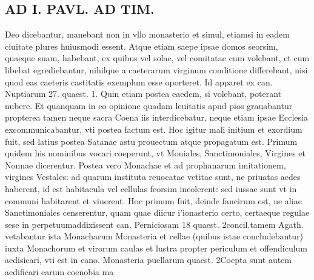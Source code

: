 \documentclass{article}
\begin{document}
\begin{pages}
\section*{AD I. PAVL. AD TIM. }
\marginpar{[ p.292 ]}\pstart Deo dicebantur, manebant non in vllo monasterio et simul, etiamsi in eadem ciuitate plures huiusmodi essent. Atque etiam saepe ipsae domos seorsim, quaeque suam, habebant, ex quibus vel solae, vel comitatae cum volebant, et cum libebat egrediebantur, nihilque a caeterarum virginum conditione differebant, nisi quod eas caeteris castitatis exemplum esse oporteret. Id apparet ex can. Nuptiarum 27. quaest. 1. Quin etiam postea eaedem, si volebant, poterant nubere. Et quanquam in eo opinione quadam leuitatis apud pios grauabantur propterea tamen neque sacra Coena iis interdicebatur, neque etiam ipsae Ecclesia excommunicabantur, vti postea factum est. Hoc igitur mali initium et exordium fuit, sed latius postea Satanae astu prouectum atque propagatum est. Primum quidem his nominibus vocari coeperunt, vt Moniales, Sanctimoniales, Virgines et Nonnae dicerentur. Postea vero Monachae et ad prophanarum imitationem, virgines Vestales: ad quarum instituta reuocatae vetitae sunt, ne priuatas aedes haberent, id est habitacula vel cellulas feorsim incolerent: sed iussae sunt vt in communi habitarent et viuerent. Hoc primum fuit, deinde fancirum est, ne aliae Sanctimoniales censerentur, quam quae diicur i'ionasterio certo, certaeque regulae sese in perpetuumaddixissent can. Perniciosam 18 quaest. 2concil.tamem Agath. vetabantur ista Monacharum Monasteria et cellae (quibus istae concludebantur) iuxta Monachorum et virorum caulas et lustra propter periculum et offendiculum aedisicari, vti est in cano. Monasteria puellarum quaest. 2Coepta sunt autem aedificari earum coenobia ma\pend

\end{pages}
\end{document}
